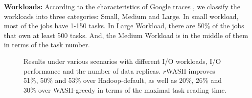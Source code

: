 \documentclass[conference]{IEEEtran}
\begin{document}
\textbf{Workloads:} According to the characteristics of Google traces \cite{b20}, we classify the workloads into three categories: Small, Medium and Large. In small workload, most of the jobs have 1-150 tasks. In Large Workload, there are 50\% of the jobs that own at least 500 tasks. And, the Medium Workload is in the middle of them in terms of the task number.


\begin{figure}[!t]
	\centering
	\quad\quad %
	\quad\quad
	\vspace{-1ex}
	\caption{Results under various scenarios with different I/O workloads, I/O performance and the number of data replicas. $r$WASH improves 51\%, 50\% and 53\% over Hadoop-default, as well as 20\%, 26\% and 30\% over WASH-greedy in terms of the maximal task reading time.}
	\label{Fig:complete}
\end{figure}
\end{document}
